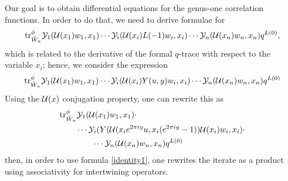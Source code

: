 \documentclass[12pt]{article}
\begin{document}
Our goal is to obtain differential equations for the genus-one correlation
functions. In order to do that, we need to derive formulae for
\begin{align*}
  \mbox{\rm tr}^\phi_{\tilde W_n} \mathcal{Y}_{1}(\mathcal{U}(x_{1})w_{1},x_{1}) \cdots \mathcal{Y}_i(\mathcal{U}(x_i)L(-1)w_i,x_i)\cdots \mathcal{Y}_{n}(\mathcal{U}(x_{n})w_{n},x_{n}) q^{L(0)},
\end{align*}
which is related to the derivative of the formal $q$-trace with respect
to the variable $x_i$; hence, we consider the expression
\begin{align*}
  \mbox{\rm tr}^\phi_{\tilde W_n} \mathcal{Y}_{1}(\mathcal{U}(x_{1})w_{1},x_{1}) \cdots \mathcal{Y}_i(\mathcal{U}(x_i)Y(u, y)w_i,x_i)\cdots \mathcal{Y}_{n}(\mathcal{U}(x_{n})w_{n},x_{n}) q^{L(0)}
\end{align*}
Using the $\mathcal{U}(x)$ conjugation property, one can
rewrite this as
\begin{align*}
  &\mbox{\rm tr}^\phi_{\tilde W_n} \mathcal{Y}_{1}(\mathcal{U}(x_{1})w_{1},x_{1})\cdot \nonumber \\
  &\qquad \cdots \mathcal{Y}_i(Y(\mathcal{U}(x_ie^{2\pi i y}u, x_i(e^{2 \pi i y}-1))
    \mathcal{U}(x_i)w_i,x_i)\cdot\nonumber \\
  &\qquad\qquad \cdots \mathcal{Y}_{n}(\mathcal{U}(x_{n})w_{n},x_{n}) q^{L(0)}
\end{align*}
then, in order to use formula \ref{identity1}, one rewrites the iterate as a product using
associativity for intertwining operators.
\end{document}
